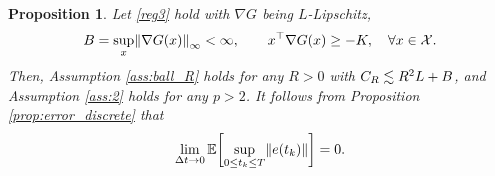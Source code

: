 \documentclass[11pt, twoside]{report}
\newtheorem{proposition}[theorem]{Proposition}
\begin{document}
\begin{proposition}\label{prop:error_discrete_part2}
Let \ref{reg3} hold
with  $\nabla G$ being $L$-Lipschitz, $$\cinfty=\sup_{x} \norm{\nabla G(x)}_\infty<\infty,\qquad x^\top \nabla G(x) \ge -\ccc, \quad \forall x\in \mathcal X.$$ 
Then, Assumption \ref{ass:ball_R} holds for any $R>0$ with $C_R \lesssim R^2 L + B$, and Assumption \ref{ass:2} holds for any $p>2$.
It follows from Proposition \ref{prop:error_discrete} that 
$$
\lim_{\deltat \to 0} \EE\bp{\sup_{0\leq t_k \leq T} \norm{e(t_k)}} = 0.
$$
\end{proposition}
\end{document}

